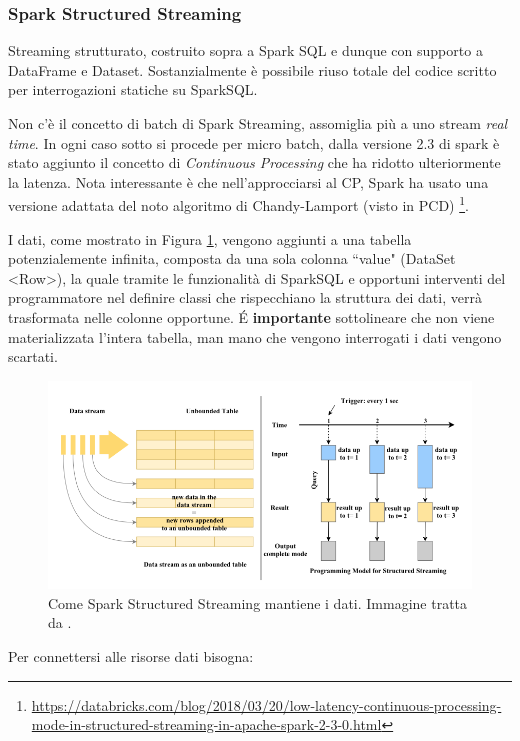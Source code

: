 \documentclass[12pt,italian]{article}
\renewcommand{\texttt}[1]{%
	\begingroup
	\ttfamily
	\begingroup\lccode`~=`/\lowercase{\endgroup\def~}{/\discretionary{}{}{}}%
	\begingroup\lccode`~=`[\lowercase{\endgroup\def~}{[\discretionary{}{}{}}%
	\begingroup\lccode`~=`.\lowercase{\endgroup\def~}{.\discretionary{}{}{}}%
	\catcode`/=\active\catcode`[=\active\catcode`.=\active
	\scantokens{#1\noexpand}%
	\endgroup
}
\begin{document}
\subsubsection{Spark Structured Streaming}\label{sec:structuredstreaming}
Streaming strutturato, costruito sopra a Spark SQL e dunque con supporto a DataFrame e Dataset. 
Sostanzialmente è possibile riuso totale del codice scritto per interrogazioni statiche su SparkSQL.
\par Non c'è il concetto di batch di Spark Streaming, assomiglia più a uno stream \textit{real time}.
In ogni caso sotto si procede per micro batch, dalla versione 2.3 di spark è stato aggiunto il concetto di \textit{Continuous Processing} che ha ridotto ulteriormente la latenza.
Nota interessante è che nell'approcciarsi al CP, Spark ha usato una versione adattata del noto algoritmo di Chandy-Lamport (visto in PCD) \footnote{\url{https://databricks.com/blog/2018/03/20/low-latency-continuous-processing-mode-in-structured-streaming-in-apache-spark-2-3-0.html}}.
\par I dati, come mostrato in Figura \ref{fig:StructuredStreaming}, vengono aggiunti a una tabella potenzialemente infinita, composta da una sola colonna ``value" (DataSet \textless Row\textgreater ),  la quale tramite le funzionalità di SparkSQL e opportuni interventi del programmatore nel definire classi che rispecchiano la struttura dei dati, verrà trasformata nelle colonne opportune.
É \textbf{importante} sottolineare che non viene materializzata l'intera tabella, man mano che vengono interrogati i dati vengono scartati. 
\begin{figure}[H]
	\centering 
	\includegraphics[width=1\linewidth]{img/sparkStructuredStreaming.png}
	\caption{Come Spark Structured Streaming mantiene i dati. Immagine tratta da \cite{structuredStreaming}.}
	\label{fig:StructuredStreaming}
\end{figure}
Per connettersi alle risorse dati bisogna:
\end{document}
